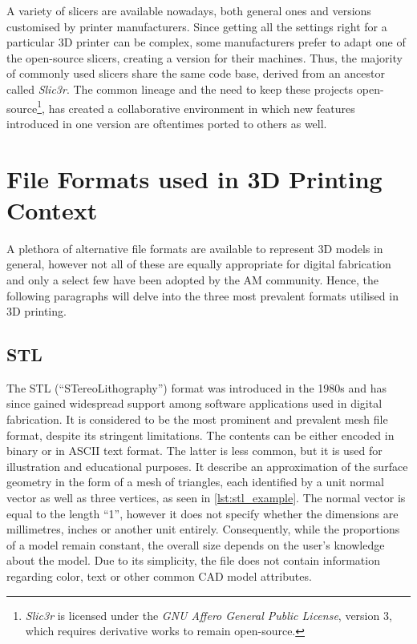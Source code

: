 A variety of slicers are available nowadays, both general ones and versions customised by printer manufacturers. 
Since getting all the settings right for a particular 3D printer can be complex, some manufacturers prefer to adapt one of the open-source slicers, creating a version for their machines.\cite[p.~58]{horvath_mastering_2018} 
Thus, the majority of commonly used slicers share the same code base, derived from an ancestor called \textit{Slic3r}. 
The common lineage and the need to keep these projects open-source\footnote{\textit{Slic3r} is licensed under the \textit{GNU Affero General Public License}, version 3, which requires derivative works to remain open-source.}, has created a collaborative environment in which new features introduced in one version are oftentimes ported to others as well. 

\section{File Formats used in 3D Printing Context}

A plethora of alternative file formats are available to represent 3D models in general, however not all of these are equally appropriate for digital fabrication and only a select few have been adopted by the AM community. 
Hence, the following paragraphs will delve into the three most prevalent formats utilised in 3D printing.

\subsection{STL}
\label{chap:stl}

The STL (``STereoLithography'') format was introduced in the 1980s and has since gained widespread support among software applications used in digital fabrication. 
It is considered to be the most prominent and prevalent mesh file format, despite its stringent limitations.
The contents can be either encoded in binary or in ASCII text format. 
The latter is less common, but it is used for illustration and educational purposes. 
It describe an approximation of the surface geometry in the form of a mesh of triangles, each identified by a unit normal vector as well as three vertices, as seen in \ref{lst:stl_example}.
The normal vector is equal to the length ``1'', however it does not specify whether the dimensions are millimetres, inches or another unit entirely. 
Consequently, while the proportions of a model remain constant, the overall size depends on the user's knowledge about the model. 
Due to its simplicity, the file does not contain information regarding color, text or other common CAD model attributes.\cite[p.~341 ff.]{gibson_additive_2010}\cite{kumar_printing_2023}

